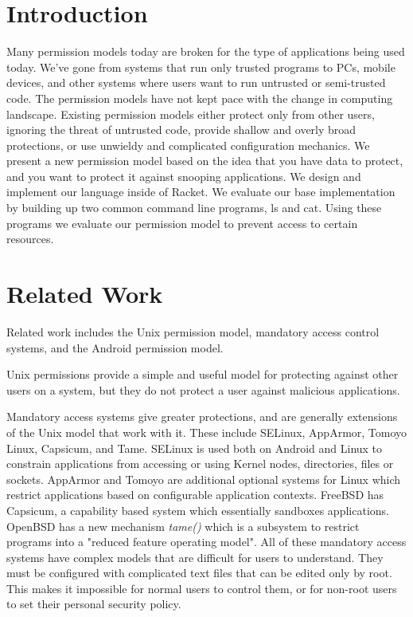 \section{Introduction}\label{section:Introduction}
Many permission models today are broken for the type of applications being used today. We've gone from systems that run only trusted programs to PCs, mobile devices, and other systems where users want to run untrusted or semi-trusted code. The permission models have not kept pace with the change in computing landscape. Existing permission models either protect only from other users, ignoring the threat of untrusted code, provide shallow and overly broad protections, or use unwieldy and complicated configuration mechanics. We present a new permission model based on the idea that you have data to protect, and you want to protect it against snooping applications. We design and implement our language inside of Racket\cite{racket}. We evaluate our base implementation by building up two common command line programs, ls and cat. Using these programs we evaluate our permission model to prevent access to certain resources.

\section{Related Work}\label{section:relatedwork}
Related work includes the Unix permission model, mandatory access control systems, and the Android permission model.

Unix permissions provide a simple and useful model for protecting against other users on a system, but they do not protect a user against malicious applications.

Mandatory access systems give greater protections, and are generally extensions of the Unix model that work with it.  These include SELinux, AppArmor, Tomoyo Linux, Capsicum, and Tame.
SELinux\cite{selinux} is used both on Android and Linux to constrain applications from accessing or using Kernel nodes, directories, files or sockets.
AppArmor and Tomoyo are additional optional systems for Linux which restrict applications based on configurable application contexts.
FreeBSD has Capsicum\cite{capsicum}, a capability based system which essentially sandboxes applications. 
OpenBSD has a new mechanism \textit{tame()}\cite{tame} which is a subsystem  to restrict programs into a "reduced feature operating model".
All of these mandatory access systems have complex models that are difficult for users to understand.  
They must be configured with complicated text files that can be edited only by root.  
This makes it impossible for normal users to control them, or for non-root users to set their personal security policy.

